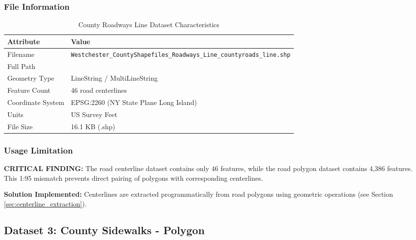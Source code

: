 \documentclass[11pt,letterpaper]{article}
\begin{document}
\subsubsection{File Information}
\begin{table}[H]
\centering
\begin{tabular}{ll}
\toprule
\textbf{Attribute} & \textbf{Value} \\
\midrule
Filename & \texttt{Westchester\_CountyShapefiles\_Roadways\_Line\_countyroads\_line.shp} \\
Full Path & \texttt{} \\
Geometry Type & LineString / MultiLineString \\
Feature Count & 46 road centerlines \\
Coordinate System & EPSG:2260 (NY State Plane Long Island) \\
Units & US Survey Feet \\
File Size & 16.1 KB (.shp) \\
\bottomrule
\end{tabular}
\caption{County Roadways Line Dataset Characteristics}
\label{tab:roads_line}
\end{table}

\subsubsection{Usage Limitation}

\textbf{CRITICAL FINDING:} The road centerline dataset contains only 46 features, while the road polygon dataset contains 4,386 features. This 1:95 mismatch prevents direct pairing of polygons with corresponding centerlines.

\textbf{Solution Implemented:} Centerlines are extracted programmatically from road polygons using geometric operations (see Section \ref{sec:centerline_extraction}).

\subsection{Dataset 3: County Sidewalks - Polygon}
\end{document}
